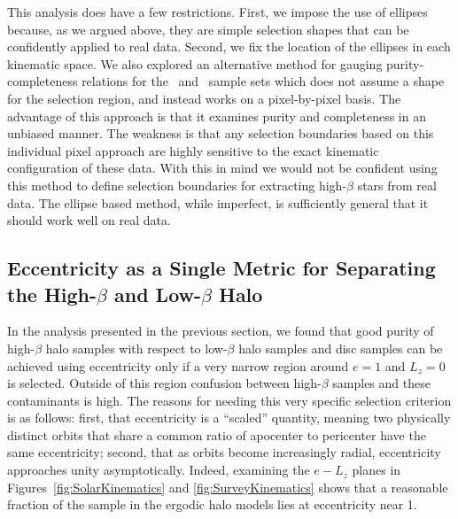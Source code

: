 This analysis does have a few restrictions. First, we impose the use of ellipses because, as we argued above, they are simple selection shapes that can be confidently applied to real data. Second, we fix the location of the ellipses in each kinematic space. We also explored an alternative method for gauging purity-completeness relations for the \solar\ and \survey\ sample sets which does not assume a shape for the selection region, and instead works on a pixel-by-pixel basis. The advantage of this approach is that it examines purity and completeness in an unbiased manner. The weakness is that any selection boundaries based on this individual pixel approach are highly sensitive to the exact kinematic configuration of these data. With this in mind we would not be confident using this method to define selection boundaries for extracting high-$\beta$ stars from real data. The ellipse based method, while imperfect, is sufficiently general that it should work well on real data.

\subsection{Eccentricity as a Single Metric for Separating the High-\texorpdfstring{$\beta$}{beta} and Low-\texorpdfstring{$\beta$}{beta} Halo}
\label{subsec:EccentricityHaloSeparation}

In the analysis presented in the previous section, we found that good purity of high-$\beta$ halo samples with respect to low-$\beta$ halo samples and disc samples can be achieved using eccentricity only if a very narrow region around $e=1$ and $L_{z}=0$ is selected. Outside of this region confusion between high-$\beta$ samples and these contaminants is high. The reasons for needing this very specific selection criterion is as follows: first, that eccentricity is a ``scaled'' quantity, meaning two physically distinct orbits that share a common ratio of apocenter to pericenter have the same eccentricity; second, that as orbits become increasingly radial, eccentricity approaches unity asymptotically. Indeed, examining the $e-L_{z}$ planes in Figures~\ref{fig:SolarKinematics} and \ref{fig:SurveyKinematics} shows that a reasonable fraction of the sample in the ergodic halo models lies at eccentricity near 1.

